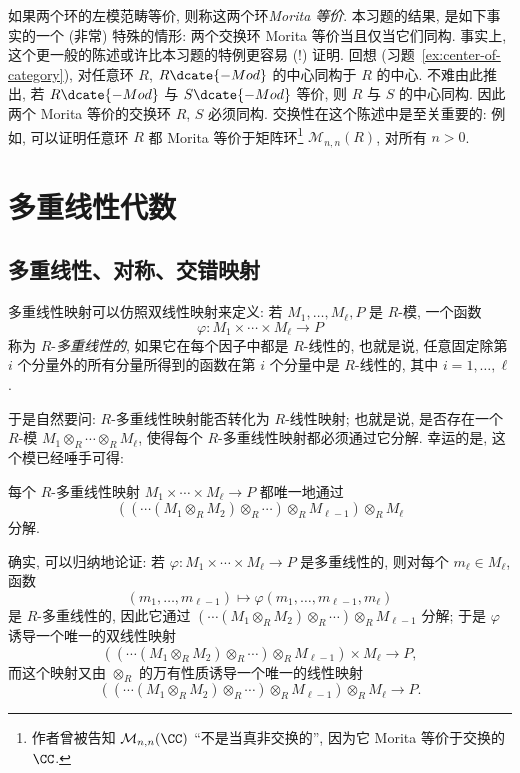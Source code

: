 如果两个环的左模范畴等价, 则称这两个环\emph{Morita 等价}. 本习题的结果, 是如下事实的一个 (非常) 特殊的情形: 两个交换环 Morita 等价当且仅当它们同构. 事实上, 这个更一般的陈述或许比本习题的特例更容易 (!) 证明. 回想 (习题~\ref{ex:center-of-category}), 对任意环 $R$, $R\dcate{-Mod}$ 的中心同构于 $R$ 的中心. 不难由此推出, 若 $R\dcate{-Mod}$ 与 $S\dcate{-Mod}$ 等价, 则 $R$ 与 $S$ 的中心同构. 因此两个 Morita 等价的交换环 $R$, $S$ 必须同构. 交换性在这个陈述中是至关重要的: 例如, 可以证明任意环 $R$ 都 Morita 等价于矩阵环\footnote{作者曾被告知 $\mathcal{M}_{n,n}(\CC)$ ``不是当真非交换的'', 因为它 Morita 等价于交换的 $\CC$.} $\mathcal{M}_{n,n}(R)$, 对所有 $n>0$.

\section{多重线性代数}
\label{sec:multilinear-algebra}

\subsection{多重线性、对称、交错映射}
\label{subsec:multilinear-maps}

多重线性映射可以仿照双线性映射来定义: 若 $M_1,\dots,M_\ell,P$ 是 $R$-模, 一个函数
\[
\varphi:M_1\times\cdots\times M_\ell\longrightarrow P
\]
称为 $R$-\emph{多重线性的}, 如果它在每个因子中都是 $R$-线性的, 也就是说, 任意固定除第 $i$ 个分量外的所有分量所得到的函数在第 $i$ 个分量中是 $R$-线性的, 其中 $i=1,\dots,\ell$.

于是自然要问: $R$-多重线性映射能否转化为 $R$-线性映射; 也就是说, 是否存在一个 $R$-模 $M_1\otimes_R\cdots\otimes_R M_\ell$, 使得每个 $R$-多重线性映射都必须通过它分解. 幸运的是, 这个模已经唾手可得:

\begin{claim}\label{claim:multilinear-tensor-factor}
每个 $R$-多重线性映射 $M_1\times\cdots\times M_\ell\to P$ 都唯一地通过
\[
((\cdots(M_1\otimes_R M_2)\otimes_R\cdots)\otimes_R M_{\ell-1})\otimes_R M_\ell
\]
分解.
\end{claim}

确实, 可以归纳地论证: 若 $\varphi:M_1\times\cdots\times M_\ell\to P$ 是多重线性的, 则对每个 $m_\ell\in M_\ell$, 函数
\[
(m_1,\dots,m_{\ell-1})\longmapsto\varphi(m_1,\dots,m_{\ell-1},m_\ell)
\]
是 $R$-多重线性的, 因此它通过 $(\cdots(M_1\otimes_R M_2)\otimes_R\cdots)\otimes_R M_{\ell-1}$ 分解; 于是 $\varphi$ 诱导一个唯一的双线性映射
\[
((\cdots(M_1\otimes_R M_2)\otimes_R\cdots)\otimes_R M_{\ell-1})\times M_\ell\longrightarrow P,
\]
而这个映射又由 $\otimes_R$ 的万有性质诱导一个唯一的线性映射
\[
((\cdots(M_1\otimes_R M_2)\otimes_R\cdots)\otimes_R M_{\ell-1})\otimes_R M_\ell\longrightarrow P.
\]

